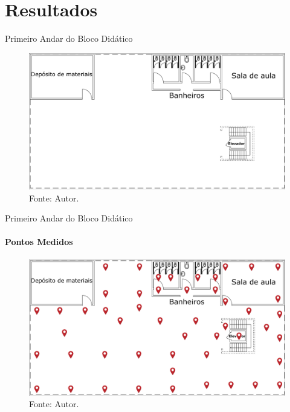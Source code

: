 \documentclass[aspectratio=169,12pt]{beamer}
\begin{document}
\section{Resultados}
\begin{frame}{Primeiro Andar do Bloco Didático}
	\vspace*{-3mm}
		\begin{figure}[H]
		\centering
		\caption*{{\fontsize{9pt}{11}\selectfont Planta Baixa do 1º andar.}}
		\includegraphics[scale=0.16]{fig_tcc/planta_andar1.pdf}
		\caption*{{\fontsize{9pt}{11}\selectfont Fonte: Autor.}}
	\end{figure}
\end{frame}
\begin{frame}{Primeiro Andar do Bloco Didático}
	\framesubtitle{Pontos Medidos}
	\vspace*{-3mm}
	\begin{figure}[H]
		\centering
		\caption*{{\fontsize{9pt}{11}\selectfont Pontos medidos no 1º andar.}}
		\includegraphics[scale=0.14]{fig_tcc/Pontos_Medidos_Andar01.pdf}
		\caption*{{\fontsize{9pt}{11}\selectfont Fonte: Autor.}}
	\end{figure}
\end{frame}
\end{document}
